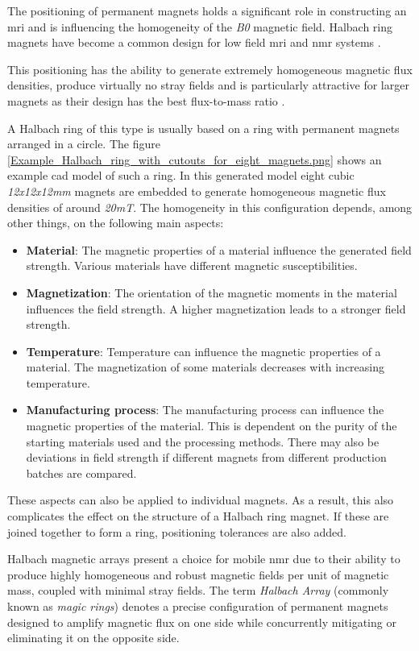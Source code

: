 The positioning of permanent magnets holds a significant role in
constructing an \gls{mri} and is influencing the homogeneity of the
\emph{B0} magnetic field. Halbach ring magnets  have
become a common design for low field \gls{mri} and \gls{nmr} systems
.

This positioning has the ability to generate extremely homogeneous
magnetic flux densities, produce virtually no stray fields and is
particularly attractive for larger magnets as their design has the best
flux-to-mass ratio .

A Halbach ring of this type is usually based on a ring with permanent
magnets arranged in a circle. The figure
\ref{Example_Halbach_ring_with_cutouts_for_eight_magnets.png} shows an
example \gls{cad} model of such a ring. In this generated model eight
cubic \emph{12x12x12mm} magnets are embedded to generate homogeneous
magnetic flux densities of around \emph{20mT}. The homogeneity in this
configuration depends, among other things, on the following main
aspects:

\begin{itemize}
\item
  \textbf{Material}: The magnetic properties of a material influence the
  generated field strength. Various materials have different magnetic
  susceptibilities.
\item
  \textbf{Magnetization}: The orientation of the magnetic moments in the
  material influences the field strength. A higher magnetization leads
  to a stronger field strength.
\item
  \textbf{Temperature}: Temperature can influence the magnetic
  properties of a material. The magnetization of some materials
  decreases with increasing temperature.
\item
  \textbf{Manufacturing process}: The manufacturing process can
  influence the magnetic properties of the material. This is dependent
  on the purity of the starting materials used and the processing
  methods. There may also be deviations in field strength if different
  magnets from different production batches are compared.
\end{itemize}

These aspects can also be applied to individual magnets. As a result,
this also complicates the effect on the structure of a Halbach ring
magnet. If these are joined together to form a ring, positioning
tolerances are also added.

Halbach magnetic arrays present a choice for mobile \gls{nmr} due to
their ability to produce highly homogeneous and robust magnetic fields
per unit of magnetic mass, coupled with minimal stray fields. The term
\emph{Halbach Array} (commonly known as \emph{magic rings}) denotes a
precise configuration of permanent magnets designed to amplify magnetic
flux on one side while concurrently mitigating or eliminating it on the
opposite side. 

